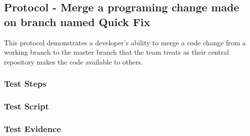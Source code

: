 \newpage
\subsection{Protocol - Merge a programing change made on branch named Quick Fix}
This protocol demonstrates a developer's ability to merge a code change
from a working branch to the master branch that the team treats as their
central repository makes the code available to others.

\subsubsection{Test Steps}
      {}
      {}

\newpage
\subsubsection{Test Script}


\newpage
\subsubsection{Test Evidence}
      {}
      {}
